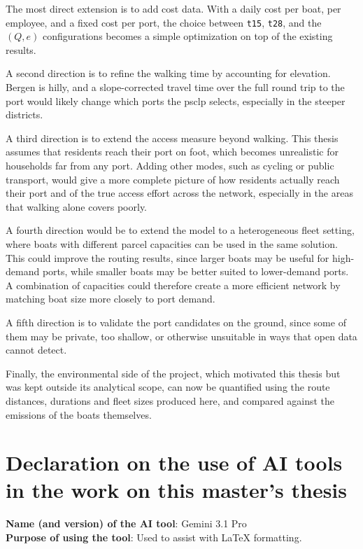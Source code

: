 \documentclass[12pt]{article}
\begin{document}
The most direct extension is to add cost data. With a daily cost per boat, per employee, and a fixed cost per port, the choice between \texttt{t15}, \texttt{t28}, and the \((Q, e)\) configurations becomes a simple optimization on top of the existing results.

A second direction is to refine the walking time by accounting for elevation. Bergen is hilly, and a slope-corrected travel time over the full round trip to the port would likely change which ports the \ac{psclp} selects, especially in the steeper districts.

A third direction is to extend the access measure beyond walking. This thesis assumes that residents reach their port on foot, which becomes unrealistic for households far from any port. Adding other modes, such as cycling or public transport, would give a more complete picture of how residents actually reach their port and of the true access effort across the network, especially in the areas that walking alone covers poorly.

A fourth direction would be to extend the model to a heterogeneous fleet setting, where boats with different parcel capacities can be used in the same solution. This could improve the routing results, since larger boats may be useful for high-demand ports, while smaller boats may be better suited to lower-demand ports. A combination of capacities could therefore create a more efficient network by matching boat size more closely to port demand.

A fifth direction is to validate the port candidates on the ground, since some of them may be private, too shallow, or otherwise unsuitable in ways that open data cannot detect.

Finally, the environmental side of the project, which motivated this thesis but was kept outside its analytical scope, can now be quantified using the route distances, durations and fleet sizes produced here, and compared against the emissions of the boats themselves.

\clearpage
\printbibliography
\appendix

\section*{Declaration on the use of AI tools in the work on this master's thesis}

\noindent \textbf{Name (and version) of the AI tool}: Gemini 3.1 Pro \\
\textbf{Purpose of using the tool}: Used to assist with LaTeX formatting.
\end{document}
